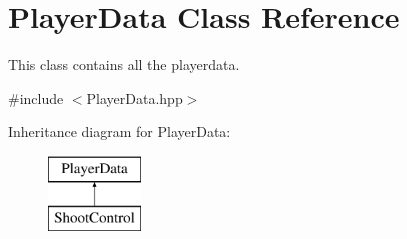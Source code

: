 \hypertarget{class_player_data}{}\section{Player\+Data Class Reference}
\label{class_player_data}


This class contains all the playerdata.  




{\ttfamily \#include $<$Player\+Data.\+hpp$>$}

Inheritance diagram for Player\+Data\+:\begin{figure}[H]
\begin{center}
\leavevmode
\includegraphics[height=2.000000cm]{class_player_data}
\end{center}
\end{figure}
